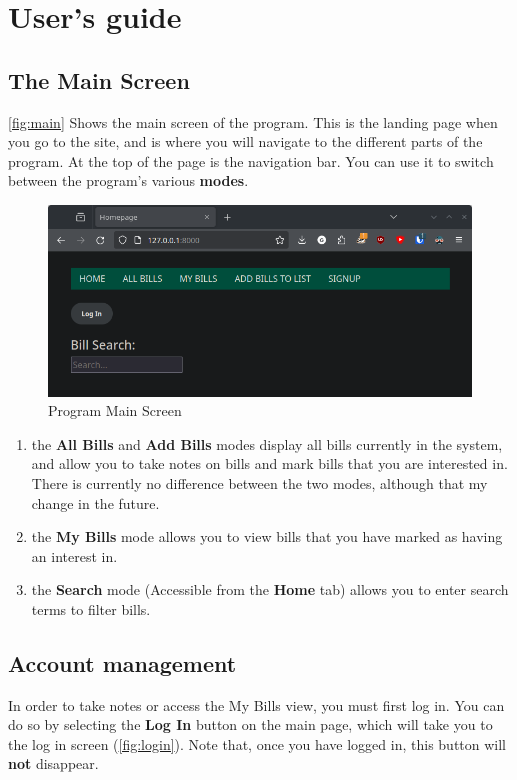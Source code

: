 \documentclass{article}
\begin{document}
\section{User's guide}
\label{sec:user}

\subsection{The Main Screen}

\autoref{fig:main} Shows the main screen of the program. This is the landing page when you go to the site, and is where you will navigate to the different parts of the program. At the top of the page is the navigation bar. You can use it to switch between the program's various \textbf{modes}.

\begin{figure}[H]
\includegraphics[width=\textwidth]{mainscreen.png}
\caption{Program Main Screen}
\label{fig:main}
\end{figure}

\begin{enumerate}
    \item the \textbf{All Bills} and \textbf{Add Bills} modes display all bills currently in the system, and allow you to take notes on bills and mark bills that you are interested in. There is currently no difference between the two modes, although that my change in the future.
    \item the \textbf{My Bills} mode allows you to view bills that you have marked as having an interest in.
    \item the \textbf{Search} mode (Accessible from the \textbf{Home} tab) allows you to enter search terms to filter bills.
\end{enumerate}

\subsection{Account management}
In order to take notes or access the My Bills view, you must first log in. You can do so by selecting the \textbf{Log In} button on the main page, which will take you to the log in screen (\autoref{fig:login}). Note that, once you have logged in, this button will \textbf{not} disappear.
\end{document}

